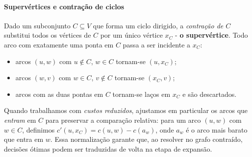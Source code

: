 \documentclass[12pt,a4paper]{article}
\begin{document}
\paragraph{Supervértices e contração de ciclos}

\paragraph{}
Dado um subconjunto \(C\subseteq V\) que forma um ciclo dirigido, a \emph{contração de \(C\)} substitui todos os vértices de \(C\) por um único vértice \(x_C\) - \textbf{o supervértice}. Todo arco com exatamente uma ponta em \(C\) passa a ser incidente a \(x_C\):
\begin{itemize}\setlength{\itemsep}{2pt}
    \item arcos \((u,w)\) com \(u\notin C\), \(w\in C\) tornam-se \((u, x_C)\);
    \item arcos \((w,v)\) com \(w\in C\), \(v\notin C\) tornam-se \((x_C, v)\);
    \item arcos com as duas pontas em \(C\) tornam-se laços em \(x_C\) e são descartados.
\end{itemize}
Quando trabalhamos com \emph{custos reduzidos}, ajustamos em particular os arcos que \emph{entram} em \(C\) para preservar a comparação relativa: para um arco \((u,w)\) com \(w\in C\), definimos \(c'(u,x_C) = c(u,w) - c(a_w)\), onde \(a_w\) é o arco mais barato que entra em \(w\). Essa normalização garante que, ao resolver no grafo contraído, decisões ótimas podem ser traduzidas de volta na etapa de expansão.
\end{document}
